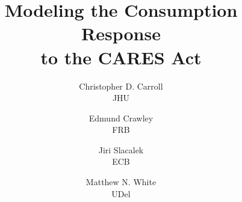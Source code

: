 \documentclass[titlepage,a4paper]{\econtex}
\renewcommand{\forcedate}{~}
\begin{document}


\hfill{\tiny \jobname}

\title{Modeling the Consumption Response\\ to the CARES Act}

{
  \author{
    Christopher D. Carroll\authNum \\ {\small JHU}
    \and
    Edmund Crawley\authNum   \\ {\small FRB}
    \and
    Jiri Slacalek\authNum    \\ {\small ECB}
    \and
    Matthew N. White\authNum \\ {\small UDel}
  }
} %



\date{\forcedate}
\maketitle
\end{document}
